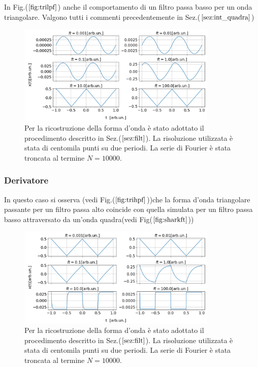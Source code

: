 \documentclass{article}
\begin{document}
            In Fig.($\ref{fig:trilpf}$) anche il comportamento di un filtro passa
            basso per un onda triangolare. Valgono tutti i commenti precedentemente in 
            Sez.($\ref{sez:int_quadra}$)
            \begin{figure}[H]
                \centering
                \includegraphics[width=0.85\textwidth]{integ_trian.png} %
                \caption{Per la ricostruzione della forma d'onda è stato adottato 
                il procedimento descritto in Sez.($\ref{sez:filt}$).
                La risoluzione utilizzata è stata di centomila punti su due periodi.
                La serie di Fourier è stata troncata al termine $N=10000$.}
                \label{fig:trilpf}
            \end{figure}
        \subsubsection{Derivatore}
            In questo caso si osserva (vedi Fig.($\ref{fig:trihpf}$))che la forma d'onda 
            triangolare passante per un filtro passa alto coincide con quella simulata 
            per un filtro passa basso attraversato da un'onda quadra(vedi Fig($\ref{fig:sharkft}$))
                \begin{figure}[H]
                    \centering
                    \includegraphics[width=0.85\textwidth]{der_trian.png} %
                    \caption{Per la ricostruzione della forma d'onda è stato adottato 
                    il procedimento descritto in Sez.($\ref{sez:filt}$).
                    La risoluzione utilizzata è stata di centomila punti su due periodi.
                    La serie di Fourier è stata troncata al termine $N=10000$.}
                    \label{fig:trihpf}
                \end{figure}
\end{document}

